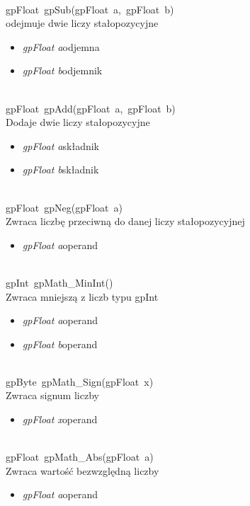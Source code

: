 \ \\
\mbox{\textsf{gpFloat gpSub(gpFloat a, gpFloat b)}} \\ \indent odejmuje dwie liczy stałopozycyjne
	\begin{itemize}
		\item \textit{gpFloat a}\quad odjemna
		\item \textit{gpFloat b}\quad odjemnik
	\end{itemize}

 \ \\
\mbox{\textsf{gpFloat gpAdd(gpFloat a, gpFloat b)}} \\ \indent Dodaje dwie liczy stałopozycyjne
	\begin{itemize}
		\item \textit{gpFloat a}\quad składnik
		\item \textit{gpFloat b}\quad składnik
	\end{itemize}

 \ \\
\mbox{\textsf{gpFloat gpNeg(gpFloat a)}} \\ \indent Zwraca liczbę przeciwną do danej liczy stałopozycyjnej
	\begin{itemize}
		\item \textit{gpFloat a}\quad operand
	\end{itemize}

 \ \\
\mbox{\textsf{gpInt gpMath_MinInt()}} \\ \indent Zwraca mniejszą z liczb typu gpInt
	\begin{itemize}
		\item \textit{gpFloat a}\quad operand
		\item \textit{gpFloat b}\quad operand
	\end{itemize}

 \ \\
\mbox{\textsf{gpByte gpMath_Sign(gpFloat x)}} \\ \indent Zwraca signum liczby
	\begin{itemize}
		\item \textit{gpFloat x}\quad operand
	\end{itemize}

 \ \\
\mbox{\textsf{gpFloat gpMath_Abs(gpFloat a)}} \\ \indent Zwraca wartość bezwzględną liczby
	\begin{itemize}
		\item \textit{gpFloat a}\quad operand
	\end{itemize}


